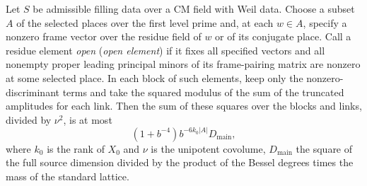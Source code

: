 \begin{lemma}
\label{lem:b-open-link}
\emitthmsource
Let $S$ be admissible filling data over a CM field with Weil data.
Choose a subset $A$ of the selected places over the first level prime and, at each $w\in A$, specify a nonzero frame vector over the residue field of $w$ or of its conjugate place.
Call a residue element \emph{open} (\emph{open element}) if it fixes all specified vectors and all nonempty proper leading principal minors of its frame-pairing matrix are nonzero at some selected place.
In each block of such elements, keep only the nonzero-discriminant terms and take the squared modulus of the sum of the truncated amplitudes for each link.
Then the sum of these squares over the blocks and links, divided by $\nu^2$, is at most
\[
 (1+b^{-4})b^{-6k_0|A|}D_{\mathrm{main}},
\]
where $k_0$ is the rank of $X_0$ and $\nu$ is the unipotent covolume,
$D_{\mathrm{main}}$ the square of the full source dimension divided by the product of the Bessel degrees times the mass of the standard lattice.
\end{lemma}
